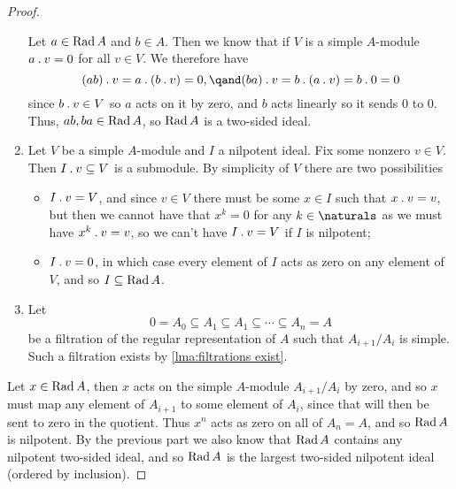 \begin{prp}{}{}
\begin{proof}
\begin{enumerate}
            Let \(a \in \operatorname{Rad} A\) and \(b \in A\).
            Then we know that if \(V\) is a simple \(A\)-module \(a \mathbin{.} v = 0\) for all \(v \in V\).
            We therefore have
            \begin{equation}
                (ab) \action v = a \action (b \action v) = 0, \qand (ba) \action v = b \action (a \action v) = b \action 0 = 0
            \end{equation}
            since \(b \mathbin{.} v \in V\) so \(a\) acts on it by zero, and \(b\) acts linearly so it sends \(0\) to \(0\).
            Thus, \(ab, ba \in \operatorname{Rad} A\), so \(\operatorname{Rad} A\) is a two-sided ideal.
            \item Let \(V\) be a simple \(A\)-module and \(I\) a nilpotent ideal.
            Fix some nonzero \(v \in V\).
            Then \(I \mathbin{.} v \subseteq V\) is a submodule.
            By simplicity of \(V\) there are two possibilities
            \begin{itemize}
                \item \(I \mathbin{.} v = V\), and since \(v \in V\) there must be some \(x \in I\) such that \(x \mathbin{.} v = v\), but then we cannot have that \(x^k = 0\) for any \(k \in \naturals\) as we must have \(x^k \mathbin{.} v = v\), so we can't have \(I \mathbin{.} v = V\) if \(I\) is nilpotent;
                \item \(I \mathbin{.} v = 0\), in which case every element of \(I\) acts as zero on any element of \(V\), and so \(I \subseteq \operatorname{Rad} A\).
            \end{itemize}
            \item Let 
            \begin{equation}
                0 = A_0 \subseteq A_1 \subseteq A_1 \subseteq \dotsb \subseteq A_n = A
            \end{equation}
            be a filtration of the regular representation of \(A\) such that \(A_{i+1}/A_i\) is simple.
            Such a filtration exists by \cref{lma:filtrations exist}.
            
        \end{enumerate}Let \(x \in \operatorname{Rad} A\), then \(x\) acts on the simple \(A\)-module \(A_{i+1}/A_i\) by zero, and so \(x\) must map any element of \(A_{i+1}\) to some element of \(A_i\), since that will then be sent to zero in the quotient.
        Thus \(x^n\) acts as zero on all of \(A_n = A\), and so \(\operatorname{Rad} A\) is nilpotent.
        By the previous part we also know that \(\operatorname{Rad} A\) contains any nilpotent two-sided ideal, and so \(\operatorname{Rad} A\) is the largest two-sided nilpotent ideal (ordered by inclusion).
    \end{proof}
\end{prp}

